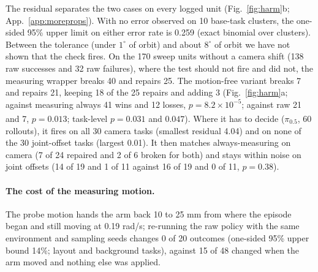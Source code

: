 \documentclass{article}
\newcommand{\pihalf}{$\pi_{0.5}$}
\newcommand{\ph}{\textsuperscript{\dag}}
\begin{document}
The residual separates the two cases on every logged unit (Fig.~\ref{fig:harm}b; App.~\ref{app:moreprops}). With no
error observed on 10 base-task clusters, the one-sided 95\% upper limit on either error rate is 0.259
(exact binomial over clusters). Between the tolerance (under $1^\circ$ of orbit) and about $8^\circ$ of orbit we have not
shown that the check fires. On the 170 sweep units without a camera shift (138 raw successes
and 32 raw failures), where the test should not fire and did not, the measuring wrapper breaks 40 and repairs 25. The
motion-free variant breaks 7 and repairs 21, keeping 18 of the 25 repairs and adding 3 (Fig.~\ref{fig:harm}a; against
measuring always 41 wins and 12 losses, $p = 8.2\times10^{-5}$; against raw 21 and 7, $p = 0.013$; task-level\ph{}
$p = 0.031$ and $0.047$). Where it has to decide\ph{} (\pihalf, 60 rollouts), it fires on all 30 camera tasks (smallest
residual 4.04) and on none of the 30 joint-offset tasks (largest 0.01). It then matches always-measuring on camera (7
of 24 repaired and 2 of 6 broken for both) and stays within noise on joint offsets (14 of 19 and 1 of 11 against 16 of
19 and 0 of 11, $p = 0.38$).

\paragraph{The cost of the measuring motion.} The probe motion hands the arm back 10 to 25 mm from where the episode
began and still moving at 0.19 rad/s; re-running the raw policy with the same environment and sampling seeds changes 0
of 20 outcomes (one-sided 95\% upper bound 14\%; layout and background tasks), against 15 of 48 changed when the arm
moved and nothing else was applied.
\end{document}
